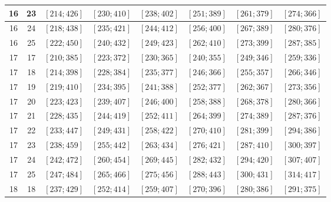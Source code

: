 \documentclass[a4paper,12pt]{article}
\begin{document}
\begin{center}
{\begin{longtable}[H]{|c|c|c|c|c|c|c|c|}
16 &  23 &  $\left[ 214; 426\right]$ &  $\left[ 230; 410\right]$ &  $\left[ 238; 402\right]$ &  $\left[ 251; 389\right]$ &  $\left[ 261; 379\right]$ &  $\left[ 274; 366\right]$ \tabularnewline \hline
16 &  24 &  $\left[ 218; 438\right]$ &  $\left[ 235; 421\right]$ &  $\left[ 244; 412\right]$ &  $\left[ 256; 400\right]$ &  $\left[ 267; 389\right]$ &  $\left[ 280; 376\right]$ \tabularnewline \hline
16 &  25 &  $\left[ 222; 450\right]$ &  $\left[ 240; 432\right]$ &  $\left[ 249; 423\right]$ &  $\left[ 262; 410\right]$ &  $\left[ 273; 399\right]$ &  $\left[ 287; 385\right]$ \tabularnewline \hline
17 &  17 &  $\left[ 210; 385\right]$ &  $\left[ 223; 372\right]$ &  $\left[ 230; 365\right]$ &  $\left[ 240; 355\right]$ &  $\left[ 249; 346\right]$ &  $\left[ 259; 336\right]$ \tabularnewline \hline
17 &  18 &  $\left[ 214; 398\right]$ &  $\left[ 228; 384\right]$ &  $\left[ 235; 377\right]$ &  $\left[ 246; 366\right]$ &  $\left[ 255; 357\right]$ &  $\left[ 266; 346\right]$ \tabularnewline \hline
17 &  19 &  $\left[ 219; 410\right]$ &  $\left[ 234; 395\right]$ &  $\left[ 241; 388\right]$ &  $\left[ 252; 377\right]$ &  $\left[ 262; 367\right]$ &  $\left[ 273; 356\right]$ \tabularnewline \hline
17 &  20 &  $\left[ 223; 423\right]$ &  $\left[ 239; 407\right]$ &  $\left[ 246; 400\right]$ &  $\left[ 258; 388\right]$ &  $\left[ 268; 378\right]$ &  $\left[ 280; 366\right]$ \tabularnewline \hline
17 &  21 &  $\left[ 228; 435\right]$ &  $\left[ 244; 419\right]$ &  $\left[ 252; 411\right]$ &  $\left[ 264; 399\right]$ &  $\left[ 274; 389\right]$ &  $\left[ 287; 376\right]$ \tabularnewline \hline
17 &  22 &  $\left[ 233; 447\right]$ &  $\left[ 249; 431\right]$ &  $\left[ 258; 422\right]$ &  $\left[ 270; 410\right]$ &  $\left[ 281; 399\right]$ &  $\left[ 294; 386\right]$ \tabularnewline \hline
17 &  23 &  $\left[ 238; 459\right]$ &  $\left[ 255; 442\right]$ &  $\left[ 263; 434\right]$ &  $\left[ 276; 421\right]$ &  $\left[ 287; 410\right]$ &  $\left[ 300; 397\right]$ \tabularnewline \hline
17 &  24 &  $\left[ 242; 472\right]$ &  $\left[ 260; 454\right]$ &  $\left[ 269; 445\right]$ &  $\left[ 282; 432\right]$ &  $\left[ 294; 420\right]$ &  $\left[ 307; 407\right]$ \tabularnewline \hline
17 &  25 &  $\left[ 247; 484\right]$ &  $\left[ 265; 466\right]$ &  $\left[ 275; 456\right]$ &  $\left[ 288; 443\right]$ &  $\left[ 300; 431\right]$ &  $\left[ 314; 417\right]$ \tabularnewline \hline
18 &  18 &  $\left[ 237; 429\right]$ &  $\left[ 252; 414\right]$ &  $\left[ 259; 407\right]$ &  $\left[ 270; 396\right]$ &  $\left[ 280; 386\right]$ &  $\left[ 291; 375\right]$ \tabularnewline \hline

\end{longtable}}
\end{center}
\end{document}
